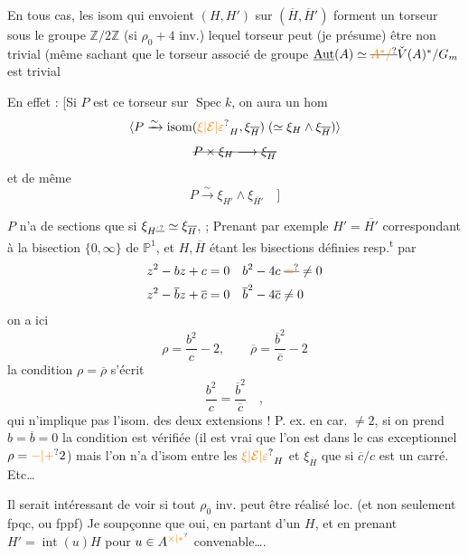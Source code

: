 En tous cas, les isom qui envoient $(H,H')$ sur $(\overline H,\overline H')$ forment un torseur sous le groupe $\mathbb Z/2\mathbb Z$ (si $\rho_0+4$ inv.) lequel torseur peut (je présume) être non trivial (même sachant que le torseur associé de groupe $\underline{\operatorname{Aut}}(A)\simeq\deleted{\unsure{A^*/}}\check V(A)^*/G_m$ est trivial

 En effet : [Si $P$ est ce torseur sur $\operatorname{Spec} k$, on aura un hom
\[
\inserted{P\xrightarrow{\sim}\operatorname{isom}(\unsure{\xi|\mathcal E|\varepsilon}_H,\xi_{\overline H})\;(\simeq\xi_H\wedge\xi_{\overline H})}
\]
\[
\deleted{P\times\xi_H\longrightarrow\xi_{\overline H}}
\]
  et de même
\[
P\xrightarrow{\sim}\xi_{H'}\wedge\xi_{\overline H'}\quad]
\]

 $P$ n'a de sections que si $\xi_{H\deleted{\unsure{'}}}\simeq\xi_{\overline H}$,  ; Prenant par exemple $H'=\overline{H'}$ correspondant à la bisection $\{0,\infty\}$ de $\mathbb P^1$, et $H,\overline H$ étant les bisections définies resp.\textsuperscript{t} par
\[
\begin{aligned}
z^2-bz+c&=0 & b^2-4c&\mathrel{\deleted{\unsure{=}}\ne}0\\ z^2-\overline b z+\overline c&=0 & \overline b^2-4\overline c&\ne0
\end{aligned}
\]
on a ici
\[
\rho=\frac{b^2}{c}-2,\qquad\overline\rho=\frac{\overline b^2}{\overline c}-2
\]
la condition $\rho=\overline\rho$ s'écrit
\[
\frac{b^2}{c}=\frac{\overline b^2}{\overline c}\quad,
\]
qui n'implique pas l'isom. des deux extensions ! P. ex. en car. $\ne2$, si on prend $b=\overline b=0$ la condition est vérifiée  (il est vrai que l'on est dans le cas exceptionnel $\rho=\unsure{-|+}2$) mais l'on n'a d'isom entre les  $\unsure{\xi|\mathcal E|\varepsilon}_H$ et $\xi_{\overline H}$ que si $\overline c/c$ est un carré.  Etc\ldots

Il serait intéressant de voir si tout $\rho_0$ inv. peut être réalisé loc.  (et non seulement fpqc, ou fppf) Je soupçonne que oui, en partant d'un $H$, et en prenant $H'=\operatorname{int}(u)H$ pour $u\in A^{\unsure{\times|*}}$ convenable\ldots.

